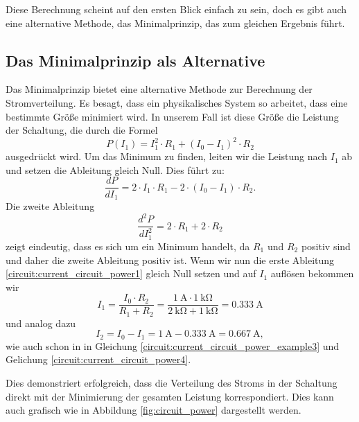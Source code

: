 Diese Berechnung scheint auf den ersten Blick einfach zu sein, doch es gibt auch eine alternative Methode, das Minimalprinzip, das zum gleichen Ergebnis führt.

\subsection{Das Minimalprinzip als Alternative} 
Das Minimalprinzip bietet eine alternative Methode zur Berechnung der Stromverteilung. Es besagt, dass ein physikalisches System so arbeitet, dass eine bestimmte Größe minimiert wird. In unserem Fall ist diese Größe die Leistung der Schaltung, die durch die Formel
\begin{equation}
	P(I_1)=  I_1^2 \cdot R_1+  (I_0-I_1)^2 \cdot R_2
	\label{circuit:current_circuit_power}
\end{equation}
ausgedrückt wird. Um das Minimum zu finden, leiten wir die Leistung nach $I_1$ ab und setzen die Ableitung gleich Null. Dies führt zu:
\begin{equation}
	\frac{dP}{dI_1} = 2\cdot I_1\cdot R_1 - 2\cdot (I_0 - I_1) \cdot R_2.
	\label{circuit:current_circuit_power1}
\end{equation}
Die zweite Ableitung 
\begin{equation}
	\frac{d^2P}{dI_1^2} = 2\cdot R_1 + 2\cdot R_2
	\label{circuit:current_circuit_power2}
\end{equation}
zeigt eindeutig, dass es sich um ein Minimum handelt, da $R_1$ und $R_2$ positiv sind und daher die zweite Ableitung positiv ist. Wenn wir nun die erste Ableitung \eqref{circuit:current_circuit_power1} gleich Null setzen und auf $I_1$ auflösen bekommen wir
\begin{equation}
	I_1 = \frac{I_0 \cdot R_2}{R_1 + R_2} = \frac{\SI{1}{\ampere} \cdot \SI{1}{\kilo\ohm}}{\SI{2}{\kilo\ohm}+ \SI{1}{\kilo\ohm}}=\SI{0.333}{\ampere}
	\label{circuit:current_circuit_power_a}
\end{equation}
und analog dazu
\begin{equation}
	I_2 = I_0-I_1=\SI{1}{\ampere}-\SI{0.333}{\ampere}=\SI{0.667}{\ampere},
	\label{circuit:current_circuit_power_b}
\end{equation}
wie auch schon in in Gleichung \eqref{circuit:current_circuit_power_example3} und Gelichung \eqref{circuit:current_circuit_power4}.

Dies demonstriert erfolgreich, dass die Verteilung des Stroms in der Schaltung direkt mit der Minimierung der gesamten Leistung korrespondiert. Dies kann auch grafisch wie in Abbildung \ref{fig:circuit_power} dargestellt werden.

